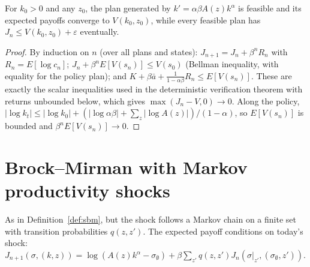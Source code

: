 \begin{theorem}[Optimality of $k'=\alpha\beta A(z)k^\alpha$]
\label{thm:sbm_optimal}
\leanok
{}
For $k_0>0$ and any $z_0$, the plan generated by $k'=\alpha\beta A(z)k^\alpha$ is feasible and its expected payoffs
converge to $V(k_0,z_0)$, while every feasible plan has $J_n\le V(k_0,z_0)+\varepsilon$ eventually.
\end{theorem}
\begin{proof}
\leanok
By induction on $n$ (over all plans and states): $J_{n+1}=J_n+\beta^nR_n$ with $R_n=E[\log c_n]$;
$J_n+\beta^nE[V(s_n)]\le V(s_0)$ (Bellman inequality, with equality for the policy plan); and
$K+\beta\bar a+\frac1{1-\alpha\beta}R_n\le E[V(s_n)]$. These are exactly the scalar inequalities used in the
deterministic verification theorem with returns unbounded below, which gives $\max(J_n-V,0)\to0$. Along the policy,
$|\log k_t|\le|\log k_0|+(|\log\alpha\beta|+\sum_z|\log A(z)|)/(1-\alpha)$, so $E[V(s_n)]$ is bounded and
$\beta^nE[V(s_n)]\to0$.
\end{proof}

\section{Brock--Mirman with Markov productivity shocks}
\label{sec:markov_brock_mirman}

\begin{definition}
\label{def:mbm}
\leanok
{}
As in Definition~\ref{def:sbm}, but the shock follows a Markov chain on a finite set with transition probabilities
$q(z,z')$. The expected payoff conditions on today's shock:
$J_{n+1}(\sigma,(k,z))=\log(A(z)k^\alpha-\sigma_\emptyset)+\beta\sum_{z'}q(z,z')J_n(\sigma|_{z'},(\sigma_\emptyset,z'))$.
\end{definition}

